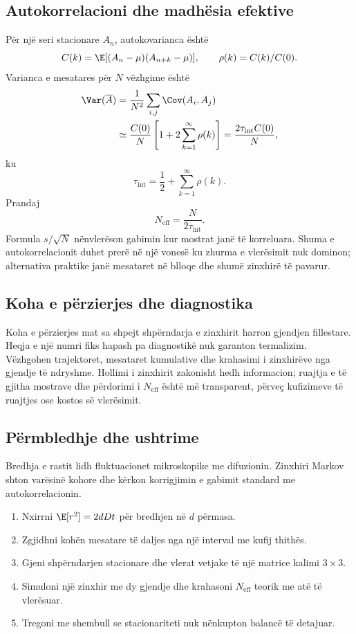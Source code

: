 \subsection{Autokorrelacioni dhe madhësia efektive}
Për një seri stacionare $A_n$, autokovarianca është
\begin{equation}
 C(k)=\E[(A_n-\mu)(A_{n+k}-\mu)],
 \qquad \rho(k)=C(k)/C(0).
\end{equation}
Varianca e mesatares për $N$ vëzhgime është
\begin{align}
 \Var(\overline A)&=\frac{1}{N^2}\sum_{i,j}\Cov(A_i,A_j)\\
 &\simeq\frac{C(0)}{N}\left[1+2\sum_{k=1}^{\infty}\rho(k)\right]
 =\frac{2\tau_{\mathrm{int}}C(0)}{N},
\end{align}
ku
\begin{equation}
 \tau_{\mathrm{int}}=\frac12+\sum_{k=1}^{\infty}\rho(k).
\end{equation}
Prandaj
\begin{equation}
 N_{\mathrm{eff}}=\frac{N}{2\tau_{\mathrm{int}}}.
\end{equation}
Formula $s/\sqrt N$ nënvlerëson gabimin kur mostrat janë të korreluara. Shuma e autokorrelacionit duhet prerë në një vonesë ku zhurma e vlerësimit nuk dominon; alternativa praktike janë mesataret në blloqe dhe shumë zinxhirë të pavarur.

\subsection{Koha e përzierjes dhe diagnostika}
Koha e përzierjes mat sa shpejt shpërndarja e zinxhirit harron gjendjen fillestare. Heqja e një numri fiks hapash pa diagnostikë nuk garanton termalizim. Vëzhgohen trajektoret, mesataret kumulative dhe krahasimi i zinxhirëve nga gjendje të ndryshme. Hollimi i zinxhirit zakonisht hedh informacion; ruajtja e të gjitha mostrave dhe përdorimi i $N_{\mathrm{eff}}$ është më transparent, përveç kufizimeve të ruajtjes ose kostos së vlerësimit.

\subsection{Përmbledhje dhe ushtrime}
Bredhja e rastit lidh fluktuacionet mikroskopike me difuzionin. Zinxhiri Markov shton varësinë kohore dhe kërkon korrigjimin e gabimit standard me autokorrelacionin.
\begin{enumerate}
\item Nxirrni $\E[r^2]=2dDt$ për bredhjen në $d$ përmasa.
\item Zgjidhni kohën mesatare të daljes nga një interval me kufij thithës.
\item Gjeni shpërndarjen stacionare dhe vlerat vetjake të një matrice kalimi $3\times3$.
\item Simuloni një zinxhir me dy gjendje dhe krahasoni $N_{\mathrm{eff}}$ teorik me atë të vlerësuar.
\item Tregoni me shembull se stacionariteti nuk nënkupton balancë të detajuar.
\end{enumerate}
